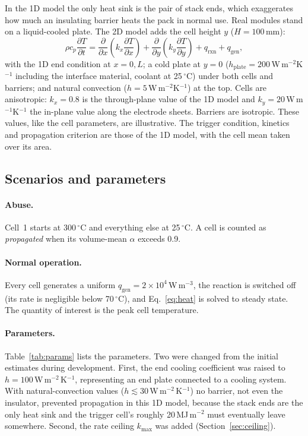 \documentclass[11pt]{article}
\newcommand{\kmax}{k_\mathrm{max}}
\begin{document}
In the 1D model the only heat sink is the pair of stack ends, which exaggerates how much
an insulating barrier heats the pack in normal use. Real modules stand on a liquid-cooled
plate. The 2D model adds the cell height $y$ ($H = 100$\,mm):
\begin{equation}
  \rho c_p \frac{\partial T}{\partial t} =
  \frac{\partial}{\partial x}\!\left(k_x \frac{\partial T}{\partial x}\right) +
  \frac{\partial}{\partial y}\!\left(k_y \frac{\partial T}{\partial y}\right) + q_\text{rxn} + q_\text{gen},
  \label{eq:heat2d}
\end{equation}
with the 1D end condition at $x = 0, L$; a cold plate at $y = 0$
($h_\text{plate} = 200$\,W\,m$^{-2}$K$^{-1}$ including the interface material, coolant at
25\,$^\circ$C) under both cells and barriers; and natural convection
($h = 5$\,W\,m$^{-2}$K$^{-1}$) at the top. Cells are anisotropic: $k_x = 0.8$ is the
through-plane value of the 1D model and $k_y = 20$\,W\,m$^{-1}$K$^{-1}$ the in-plane
value along the electrode sheets. Barriers are isotropic. These values, like the cell
parameters, are illustrative. The trigger condition, kinetics and propagation criterion
are those of the 1D model, with the cell mean taken over its area.

\subsection{Scenarios and parameters}

\paragraph{Abuse.} Cell~1 starts at 300\,$^\circ$C and everything else at 25\,$^\circ$C.
A cell is counted as \emph{propagated} when its volume-mean $\alpha$ exceeds 0.9.

\paragraph{Normal operation.} Every cell generates a uniform
$q_\mathrm{gen} = 2\times10^4$\,W\,m$^{-3}$, the reaction is switched off (its rate is
negligible below 70\,$^\circ$C), and Eq.~\eqref{eq:heat} is solved to steady state. The
quantity of interest is the peak cell temperature.

\paragraph{Parameters.} Table~\ref{tab:params} lists the parameters. Two were changed
from the initial estimates during development. First, the end cooling coefficient was
raised to $h = 100$\,W\,m$^{-2}$\,K$^{-1}$, representing an end plate connected to a
cooling system. With natural-convection values ($h \lesssim 30$\,W\,m$^{-2}$\,K$^{-1}$)
no barrier, not even the insulator, prevented propagation in this 1D model, because the
stack ends are the only heat sink and the trigger cell's roughly 20\,MJ\,m$^{-2}$ must
eventually leave somewhere. Second, the rate ceiling $\kmax$ was added
(Section~\ref{sec:ceiling}).
\end{document}
